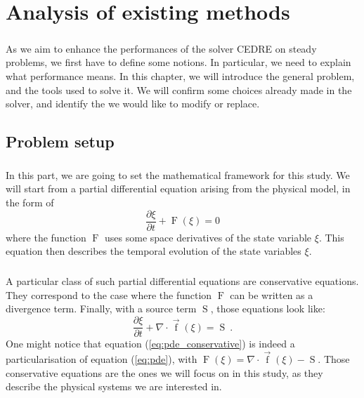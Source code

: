 \chapter{Analysis of existing methods}

  \paragraph{}
  As we aim to enhance the performances of the solver CEDRE on steady problems, we first have to define some notions.
  In particular, we need to explain what performance means.
  In this chapter, we will introduce the general problem, and the tools used to solve it.
  We will confirm some choices already made in the solver, and identify the  we would like to modify or replace.

  \section{Problem setup}

    \paragraph{}
    In this part, we are going to set the mathematical framework for this study.
    We will start from a partial differential equation arising from the physical model, in the form of
    \begin{equation}\label{eq:pde}
      \frac{\partial \xi}{\partial t} + \operatorname{F}\left(\xi\right) = 0
    \end{equation}
    where the function $\operatorname{F}$ uses some space derivatives of the state variable $\xi$.
    This equation then describes the temporal evolution of the state variables $\xi$.

    \paragraph{}
    A particular class of such partial differential equations are conservative equations.
    They correspond to the case where the function $\operatorname{F}$ can be written as a divergence term.
    Finally, with a source term $\operatorname{S}$, those equations look like:
    \begin{equation}\label{eq:pde_conservative}
      \frac{\partial \xi}{\partial t} + \nabla \cdot \vec{\operatorname{f}}\left(\xi\right) = \operatorname{S}\ .
    \end{equation}
    One might notice that equation (\ref{eq:pde_conservative}) is indeed a particularisation of equation (\ref{eq:pde}), with $\operatorname{F}\left(\xi\right) = \nabla\cdot \vec{\operatorname{f}}\left(\xi\right) - \operatorname{S}$.
    Those conservative equations are the ones we will focus on in this study, as they describe the physical systems we are interested in.

